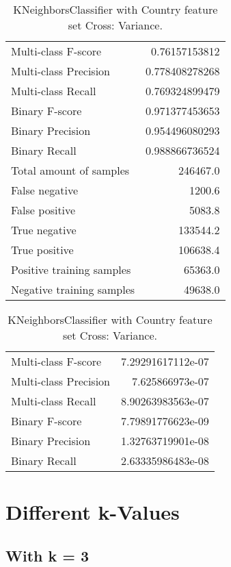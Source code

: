 \begin{table}[H]
\begin{minipage}{0.5\textwidth}
\caption{KNeighborsClassifier with Country feature set Cross: Average.}
\centering
\begin{tabular}{l r}
\toprule
Multi-class F-score & 0.76157153812 \\
Multi-class Precision & 0.778408278268 \\
Multi-class Recall & 0.769324899479 \\
\midrule
Binary F-score & 0.971377453653 \\
Binary Precision & 0.954496080293 \\
Binary Recall & 0.988866736524 \\
\midrule
Total amount of samples & 246467.0 \\
False negative & 1200.6 \\
False positive & 5083.8 \\
True negative & 133544.2 \\
True positive & 106638.4 \\
\midrule
Positive training samples & 65363.0 \\
Negative training samples & 49638.0 \\
\bottomrule
\end{tabular}
\end{minipage}
\hfillx
\begin{minipage}{0.5\textwidth}
\caption{KNeighborsClassifier with Country feature set Cross: Variance.}
\centering
\begin{tabular}{l r}
\toprule
Multi-class F-score & 7.29291617112e-07 \\
Multi-class Precision & 7.625866973e-07 \\
Multi-class Recall & 8.90263983563e-07 \\
\midrule
Binary F-score & 7.79891776623e-09 \\
Binary Precision & 1.32763719901e-08 \\
Binary Recall & 2.63335986483e-08 \\
\bottomrule
\end{tabular}
\end{minipage}
\end{table}

\newpage
\section{Different k-Values}
\subsection{With k = 3}

